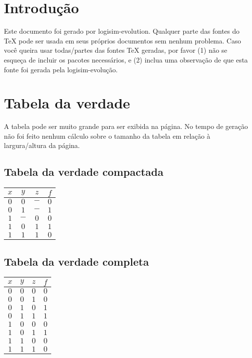 \documentclass [15pt,a4paper,twoside]{article}
\begin{document}
\section{Introdução}
Este documento foi gerado por logisim-evolution. Qualquer parte das fontes do TeX pode ser usada em seus próprios documentos sem nenhum problema. Caso você queira usar todas/partes das fontes TeX geradas, por favor (1) não se esqueça de incluir os pacotes necessários, e (2) inclua uma observação de que esta fonte foi gerada pela logisim-evolução.
\section{Tabela da verdade}
A tabela pode ser muito grande para ser exibida na página. No tempo de geração não foi feito nenhum cálculo sobre o tamanho da tabela em relação à largura/altura da página.
\subsection{Tabela da verdade compactada}
\begin{center}
\begin{tabular}{ccc|c}
$x$&$y$&$z$&$f$\\
\hline
$0$&$0$&$-$&$0$\\
$0$&$1$&$-$&$1$\\
$1$&$-$&$0$&$0$\\
$1$&$0$&$1$&$1$\\
$1$&$1$&$1$&$0$\\

\end{tabular}
\end{center}
\subsection{Tabela da verdade completa}
\begin{center}
\begin{tabular}{ccc|c}
$x$&$y$&$z$&$f$\\
\hline
$0$&$0$&$0$&$0$\\
$0$&$0$&$1$&$0$\\
$0$&$1$&$0$&$1$\\
$0$&$1$&$1$&$1$\\
$1$&$0$&$0$&$0$\\
$1$&$0$&$1$&$1$\\
$1$&$1$&$0$&$0$\\
$1$&$1$&$1$&$0$\\

\end{tabular}
\end{center}
\end{document}
